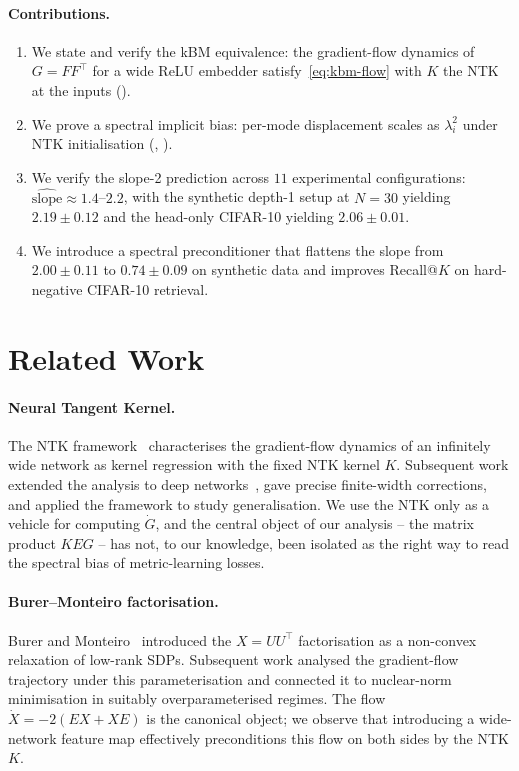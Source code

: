 \documentclass[11pt]{article}
\theoremstyle{definition}
\theoremstyle{plain}
\begin{document}
\paragraph{Contributions.}
\begin{enumerate}
\item We state and verify the kBM equivalence: the gradient-flow dynamics of
$G=FF^\top$ for a wide ReLU embedder satisfy~\eqref{eq:kbm-flow} with $K$ the
NTK at the inputs ().
\item We prove a spectral implicit bias: per-mode displacement scales as
$\lambda_i^2$ under NTK initialisation
(, ).
\item We verify the slope-2 prediction across $11$ experimental
configurations: $\widehat{\mathrm{slope}}\approx 1.4$--$2.2$, with the
synthetic depth-1 setup at $N=30$ yielding $2.19\pm 0.12$ and the head-only
CIFAR-10 yielding $2.06\pm 0.01$.
\item We introduce a spectral preconditioner that flattens the slope from
$2.00\pm 0.11$ to $0.74\pm 0.09$ on synthetic data and improves Recall@$K$ on
hard-negative CIFAR-10 retrieval.
\end{enumerate}

\section{Related Work}
\label{sec:related}

\paragraph{Neural Tangent Kernel.}
The NTK framework~\citep{jacot2018ntk} characterises the gradient-flow
dynamics of an infinitely wide network as kernel regression with the fixed NTK
kernel $K$. Subsequent work extended the analysis to deep
networks~\citep{lee2019wide,arora2019exact}, gave precise finite-width
corrections, and applied the framework to study generalisation. We use the
NTK only as a vehicle for computing $\dot G$, and the central object of our
analysis -- the matrix product $K E G$ -- has not, to our knowledge, been
isolated as the right way to read the spectral bias of metric-learning losses.

\paragraph{Burer--Monteiro factorisation.}
Burer and Monteiro~\citep{burer2003nonlinear} introduced the
$X=UU^\top$ factorisation as a non-convex relaxation of low-rank SDPs.
Subsequent work analysed the gradient-flow trajectory under this
parameterisation and connected it to nuclear-norm minimisation in suitably
overparameterised regimes. The flow $\dot X=-2(EX+XE)$ is the canonical
object; we observe that introducing a wide-network feature map effectively
preconditions this flow on both sides by the NTK $K$.
\end{document}
